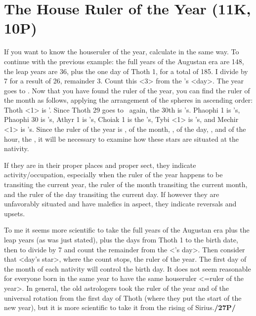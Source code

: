 \section{The House Ruler of the Year (11K, 10P)}
\mnm[0.3cm]
If you want to know the houseruler of the year, calculate in the same way. To continue with the previous example: the full years of the Augustan era are 148, the leap years are 36, plus the one day of Thoth 1, for a total of 185. I divide by 7 for a result of 26, remainder 3. Count this <3> from the \Sun’s
<day>. The year goes to \Mars. 
Now that you have found the ruler of the year, you can find the ruler of the month as follows, applying the arrangement of the spheres in ascending order: Thoth <1> is \Mars’. Since
Thoth 29 goes to \Mars\, again, the 30th is \Mercury’s. Phaophi 1 is \Jupiter’s, Phaophi 30 is \Venus’s, Athyr
1 is \Saturn’s, Choiak 1 is the \Moon’s, Tybi <1> is \Mercury’s, and Mechir <1> is \Venus’s. Since the
ruler of the year is \Mars, of the month, \Venus, of the day, \Mercury, and of the hour, the \Sun, it will be necessary to examine how these stars are situated at the nativity. 

\mndl[0.2cm]
If they are in their proper places and proper sect, they indicate activity/occupation, especially when the ruler of the year happens to be transiting the current year, the ruler of the month transiting the current month, and the ruler of the day transiting the current day. If however they are unfavorably situated and have malefics in aspect, they indicate reversals
and upsets.

To me it seems more scientific to take the full years of the Augustan era plus the leap years (as was just stated), plus the days from Thoth 1 to the birth date, then to divide by 7 and count the remainder from the \Sun<’s day>. Then consider that <day’s star>, where the count stops, the ruler of the year. The first day of the month of each nativity will control the birth day. It does not seem reasonable for everyone born in the same year to have the same houseruler <=ruler of the year>. In general, the old astrologers took the ruler of the year and of the universal rotation from the first day of Thoth (where they put the start of the new year), but it is more scientific to take it from the rising of Sirius.\textbf{/27P/}
\newpage